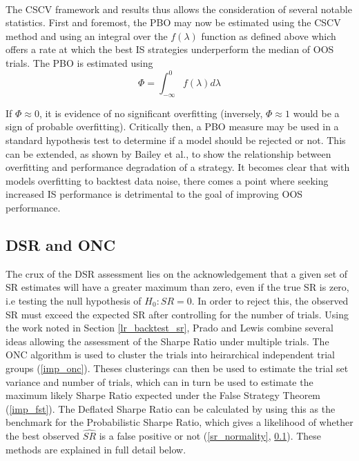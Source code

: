 \documentclass[a4paper,11pt,oneside]{article}
\theoremstyle{plain}
\theoremstyle{definition}
\begin{document}
	
	
	\texttt{\\}
	\newline The CSCV framework and results thus allows the consideration of several notable statistics. First and foremost, 
	the PBO may now be estimated using the CSCV method and using an integral over the $f(\lambda)$ function 
	as defined above which offers a rate at which the best IS strategies underperform the median of OOS trials. The PBO is estimated using
	\begin{equation}
	\Phi = \int_{-\infty}^{0} f (\lambda) d \lambda
	\end{equation}
	
	
	If $\Phi \approx 0$,
	it is evidence of no significant overfitting (inversely, $\Phi \approx 1$ would be a sign of probable overfitting). Critically then, a PBO measure may be used in a standard hypothesis test to determine if a model should be rejected or not. This 
	can be extended, as shown by Bailey et al., to show the relationship between overfitting and performance 
	degradation of a strategy. It becomes clear that with models overfitting to backtest data noise, there comes a point 
	where seeking increased IS performance is detrimental to the goal of improving OOS performance.  
	\hfill \break 
	
	
	\subsection{DSR and ONC}\label{imp_dsr}
	
	The crux of the DSR assessment lies on the acknowledgement that a given set of SR estimates will have a greater maximum than zero, even if the true SR is zero, i.e testing the null hypothesis of $H_0:SR=0$. In order to reject this, the observed SR must exceed the expected SR after controlling for the number of trials. Using the 
	work noted in Section \ref{lr_backtest_sr}, Prado and Lewis combine several ideas allowing the assessment of the Sharpe Ratio under multiple trials. The ONC algorithm is used to cluster the trials into heirarchical independent trial groups (\ref{imp_onc}). Theses clusterings can then be used to estimate the trial set variance and number of trials, which can in turn be used to estimate the maximum likely Sharpe Ratio expected under the False Strategy Theorem (\ref{imp_fst}). The Deflated Sharpe Ratio can be calculated by using this as the benchmark for the Probabilistic Sharpe Ratio, which gives a likelihood of whether the best observed $\widehat{SR}$ is a false positive or not (\ref{sr_normality}, \ref{imp_dsr}). These methods are explained in full detail below.
	
\end{document}
